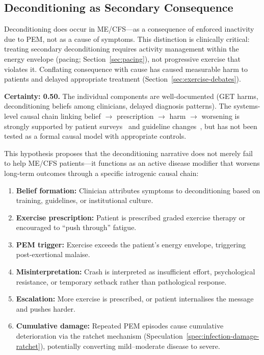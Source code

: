 \subsection{Deconditioning as Secondary Consequence}

Deconditioning does occur in ME/CFS---as a consequence of enforced inactivity due to PEM, not as a cause of symptoms. This distinction is clinically critical: treating secondary deconditioning requires activity management within the energy envelope (pacing; Section~\ref{sec:pacing}), not progressive exercise that violates it. Conflating consequence with cause has caused measurable harm to patients and delayed appropriate treatment (Section~\ref{sec:exercise-debates}).

\begin{hypothesis}
\label{hyp:deconditioning-iatrogenic}

\textbf{Certainty: 0.50.} The individual components are well-documented (GET harms, deconditioning beliefs among clinicians, delayed diagnosis patterns). The systems-level causal chain linking belief $\rightarrow$ prescription $\rightarrow$ harm $\rightarrow$ worsening is strongly supported by patient surveys~\cite{Kindlon2011GET} and guideline changes~\cite{NICE2021mecfs}, but has not been tested as a formal causal model with appropriate controls.

This hypothesis proposes that the deconditioning narrative does not merely fail to help ME/CFS patients---it functions as an active disease modifier that worsens long-term outcomes through a specific iatrogenic causal chain:

\begin{enumerate}
    \item \textbf{Belief formation:} Clinician attributes symptoms to deconditioning based on training, guidelines, or institutional culture.
    \item \textbf{Exercise prescription:} Patient is prescribed graded exercise therapy or encouraged to ``push through'' fatigue.
    \item \textbf{PEM trigger:} Exercise exceeds the patient's energy envelope, triggering post-exertional malaise.
    \item \textbf{Misinterpretation:} Crash is interpreted as insufficient effort, psychological resistance, or temporary setback rather than pathological response.
    \item \textbf{Escalation:} More exercise is prescribed, or patient internalises the message and pushes harder.
    \item \textbf{Cumulative damage:} Repeated PEM episodes cause cumulative deterioration via the ratchet mechanism (Speculation~\ref{spec:infection-damage-ratchet}), potentially converting mild--moderate disease to severe.
\end{enumerate}


\end{hypothesis}
